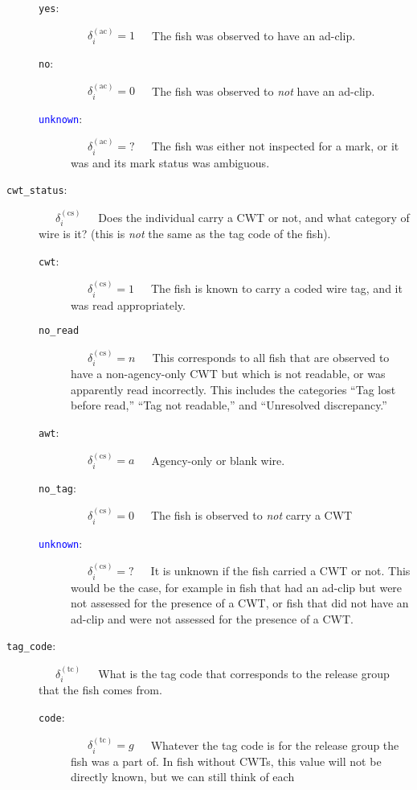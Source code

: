 \documentclass[11pt]{article}
\begin{document}
\begin{description}
\begin{description}
		\item [{\tt yes}:]  ~~~$\delta_i^{(\mathrm{ac})} = 1$~~~The fish was observed to have an ad-clip.
		\item [{\tt no}:]  ~~~$\delta_i^{(\mathrm{ac})} = 0$~~~The fish was observed to {\em not} have an ad-clip.
		\item [\textcolor{blue}{{\tt unknown}}:]  ~~~$\delta_i^{(\mathrm{ac})} = \mbox{?}$~~~The fish was either not
		inspected for a mark, or it was and its mark status was ambiguous.
	\end{description}
	\item [{\tt cwt\_status}:] ~~~$\delta_i^{(\mathrm{cs})}$~~~Does the individual carry a CWT or not, and what category of wire is
	it? (this is {\em not} the same as the tag code of the fish).
	\begin{description}
		\item [{\tt cwt}:] ~~~$\delta_i^{(\mathrm{cs})} = 1$~~~The fish is known to carry a coded wire tag, and it
		was read appropriately.
		\item [{\tt no\_read}] ~~~$\delta_i^{(\mathrm{cs})} = n$~~~This corresponds to all fish that
		are observed to have a non-agency-only CWT but which is not readable, or was apparently read incorrectly.  This 
		includes the categories ``Tag lost before read,'' ``Tag not readable,'' 
		and ``Unresolved discrepancy.''
		\item [{\tt awt}:] ~~~$\delta_i^{(\mathrm{cs})} = a$~~~Agency-only or blank wire.
		\item [{\tt no\_tag}:] ~~~$\delta_i^{(\mathrm{cs})} = 0$~~~The fish is observed to {\em not} carry a CWT
		\item [\textcolor{blue}{{\tt unknown}}:] ~~~$\delta_i^{(\mathrm{cs})} = \mbox{?}$~~~It is unknown if the fish carried a CWT or not.  This would be the case, for example
		in fish that had an ad-clip but were not assessed for the presence of a CWT, or fish that did not have
		an ad-clip and were not assessed for the presence of a CWT.
	\end{description}
	\item [{\tt tag\_code}:] ~~~$\delta_i^{(\mathrm{tc})}$~~~What is the tag code that corresponds to the release group that the fish comes from.
	\begin{description}
		\item [{\tt code}:] ~~~$\delta_i^{(\mathrm{tc})} = g$~~~Whatever the tag code is for the release group the fish was a part of.  In fish without CWTs, this value will not be directly known, but we can still think of each

\end{description}
\end{description}
\end{document}
